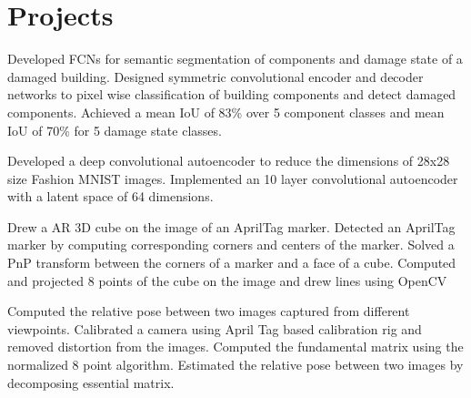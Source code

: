 \section{Projects}
\resumeSubHeadingListStart

\resumeItemListStart
{}
{Developed FCNs for semantic segmentation of components and damage state of a damaged building.}
{Designed symmetric convolutional encoder and decoder networks to pixel wise classification of building components and detect damaged components.}
{Achieved a mean IoU of 83\% over 5 component classes and mean IoU of 70\% for 5 damage state classes.}
\resumeItemListEnd

\resumeItemListStart
{}
{Developed a deep convolutional autoencoder to reduce the dimensions of 28x28 size Fashion MNIST images.}
{Implemented an 10 layer convolutional autoencoder with a latent space of 64 dimensions.}
\resumeItemListEnd

\resumeItemListStart
{}
{Drew a AR 3D cube on the image of an AprilTag marker.}
{Detected an AprilTag marker by computing corresponding corners and centers of the marker.}
{Solved a PnP transform between the corners of a marker and a face of a cube.}
{Computed and projected 8 points of the cube on the image and drew lines using OpenCV}
\resumeItemListEnd

\resumeItemListStart
{}
{Computed the relative pose between two images captured from different viewpoints.}
{Calibrated a camera using April Tag based calibration rig and removed distortion from the images.}
{Computed the fundamental matrix using the normalized 8 point algorithm.}
{Estimated the relative pose between two images by decomposing essential matrix.}
\resumeItemListEnd


